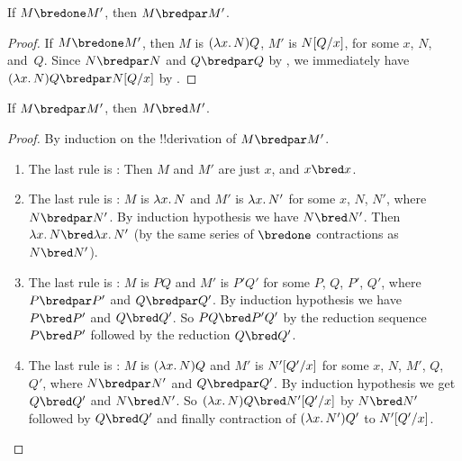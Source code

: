 \documentclass[../../../include/open-logic-section]{subfiles}
\begin{document}


\begin{lem}
  If $M \bredone M'$, then $M \bredpar M'$.
\end{lem}
\begin{proof} If $M \bredone M'$, then $M$ is
    $(\lambd[x][N])Q$, $M'$ is $N[Q/x]$, for some
    $x$, $N$, and~$Q$. Since $N \bredpar N$ and $Q \bredpar Q$ by
    , we immediately have $(\lambd[x][N])Q
    \bredpar \Subst{N}{Q}{x}$ by .
\end{proof}

\begin{lem}
  If $M \bredpar M'$, then $M \bred M'$.
\end{lem}

\begin{proof} By induction on the !!{derivation} of $M \bredpar M'$.
  \begin{enumerate}
  \item The last rule is : Then $M$ and $M'$
    are just $x$, and $x \bred x$.
  \item The last rule is : $M$ is 
    $\lambd[x][N]$ and $M'$ is $\lambd[x][N']$ for some $x$, $N$, $N'$, where
    $N \bredpar N'$. By induction hypothesis we have $N \bred N'$. Then
    $\lambd[x][N] \bred \lambd[x][N']$ (by the same series of
    $\bredone$ contractions as $N \bred N'$).
  \item The last rule is : $M$ is 
    $PQ$ and $M'$ is $P'Q'$ for some $P$, $Q$, $P'$, $Q'$, where $P \bredpar P'$
    and $Q \bredpar Q'$. By induction hypothesis we have $P \bred P'$ and $Q \bred
    Q'$.  So $PQ \bred P'Q'$ by the reduction sequence $P \bred P'$ followed
    by the reduction $Q \bred Q'$.
  \item The last rule is : $M$ is
    $(\lambd[x][N])Q$ and $M'$ is  $N'[Q'/x]$ for some $x$,
    $N$, $M'$, $Q$, $Q'$, where $N \bredpar N'$ and $Q \bredpar Q'$.
    By induction hypothesis we get $Q \bred Q'$ and $N \bred N'$. So
    $(\lambd[x][N])Q \bred \Subst{N'}{Q'}{x}$ by $N \bred N'$ followed
    by $Q \bred Q'$ and finally contraction of $(\lambd[x][N'])Q'$ to
    $N'[Q'/x]$.
  \end{enumerate}
\end{proof}
\end{document}
